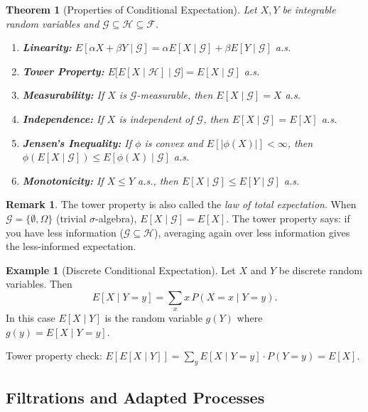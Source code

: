 \documentclass[12pt, a4paper]{article}
\theoremstyle{definition}
\newtheorem{example}{Example}[section]
\newtheorem{remark}{Remark}[section]
\theoremstyle{plain}
\newtheorem{theorem}{Theorem}[section]
\begin{document}
\begin{theorem}[Properties of Conditional Expectation]
Let $X, Y$ be integrable random variables and $\mathcal{G} \subseteq \mathcal{H} \subseteq \mathcal{F}$.
\begin{enumerate}[label=(\roman*)]
  \item \textbf{Linearity:} $E[\alpha X + \beta Y \mid \mathcal{G}] = \alpha E[X \mid \mathcal{G}] + \beta E[Y \mid \mathcal{G}]$ a.s.
  \item \textbf{Tower Property:} $E\bigl[E[X \mid \mathcal{H}] \mid \mathcal{G}\bigr] = E[X \mid \mathcal{G}]$ a.s.
  \item \textbf{Measurability:} If $X$ is $\mathcal{G}$-measurable, then $E[X \mid \mathcal{G}] = X$ a.s.
  \item \textbf{Independence:} If $X$ is independent of $\mathcal{G}$, then $E[X \mid \mathcal{G}] = E[X]$ a.s.
  \item \textbf{Jensen's Inequality:} If $\phi$ is convex and $E[|\phi(X)|] < \infty$, then $\phi(E[X \mid \mathcal{G}]) \leq E[\phi(X) \mid \mathcal{G}]$ a.s.
  \item \textbf{Monotonicity:} If $X \leq Y$ a.s., then $E[X \mid \mathcal{G}] \leq E[Y \mid \mathcal{G}]$ a.s.
\end{enumerate}
\end{theorem}

\begin{remark}
The tower property is also called the \emph{law of total expectation}. When $\mathcal{G} = \{\emptyset, \Omega\}$ (trivial $\sigma$-algebra), $E[X \mid \mathcal{G}] = E[X]$. The tower property says: if you have less information ($\mathcal{G} \subseteq \mathcal{H}$), averaging again over less information gives the less-informed expectation.
\end{remark}

\begin{example}[Discrete Conditional Expectation]
Let $X$ and $Y$ be discrete random variables. Then
\[
  E[X \mid Y = y] = \sum_x x \, P(X = x \mid Y = y).
\]
In this case $E[X \mid Y]$ is the random variable $g(Y)$ where $g(y) = E[X \mid Y = y]$.

Tower property check: $E[E[X \mid Y]] = \sum_y E[X \mid Y=y] \cdot P(Y=y) = E[X]$.
\end{example}

\subsection{Filtrations and Adapted Processes}
\end{document}
